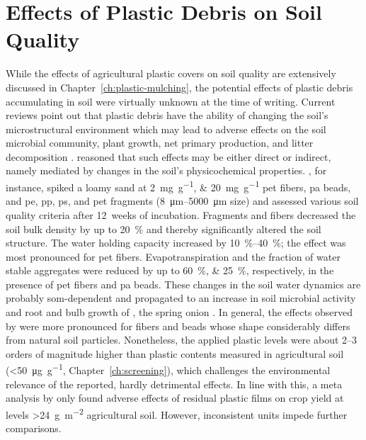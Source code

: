 \section{Effects of Plastic Debris on Soil Quality}
\label{sec:general-discussion:effects}

While the effects of agricultural plastic covers on soil quality are extensively discussed in Chapter~\ref{ch:plastic-mulching}, the potential effects of plastic debris accumulating in soil were virtually unknown at the time of writing.
Current reviews point out that plastic debris have the ability of changing the soil's microstructural environment which may lead to adverse effects on the soil microbial community, plant growth, net primary production, and litter decomposition \citep{RilligMicroplastic2021,MbachuRise2021,QiBehavior2020}.  reasoned that such effects may be either direct or indirect, namely mediated by changes in the soil's physicochemical properties. , for instance, spiked a loamy sand at \SIlist{2;20}{\milli\gram\per\gram} \ac{pet} fibers, \ac{pa} beads, and \ac{pe}, \ac{pp}, \ac{ps}, and \ac{pet} fragments (\SIrange{8}{5000}{\micro\meter} size) and assessed various soil quality criteria after \SI{12}{weeks} of incubation. Fragments and fibers decreased the soil bulk density by up to \SI{20}{\percent} and thereby significantly altered the soil structure. The water holding capacity increased by \SIrange{10}{40}{\percent}; the effect was most pronounced for \ac{pet} fibers. Evapotranspiration and the fraction of water stable aggregates were reduced by up to \SIlist{60;25}{\percent}, respectively, in the presence of \ac{pet} fibers and \ac{pa} beads. These changes in the soil water dynamics are probably \ac{som}-dependent \citep{ZhangVariations2020,LiangEffects2021} and propagated to an increase in soil microbial activity and root and bulb growth of , the spring onion \citep{deSouzaMachadoMicroplastics2019}. In general, the effects observed by \citet{deSouzaMachadoMicroplastics2019} were more pronounced for fibers and beads whose shape considerably differs from natural soil particles.
Nonetheless, the applied plastic levels were about \numrange{2}{3} orders of magnitude higher than plastic contents measured in agricultural soil (\SI{<50}{\micro\gram\per\gram}, Chapter~\ref{ch:screening}), which challenges the environmental relevance of the reported, hardly detrimental effects. In line with this, a meta analysis by \citet{GaoEffects2019} only found adverse effects of residual plastic films on crop yield at levels \SI{>24}{\gram\per\square\meter} agricultural soil. However, inconsistent units impede further comparisons.

